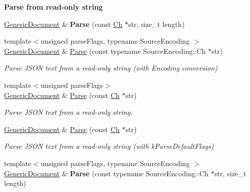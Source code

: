 \begin{Indent}{\bf Parse from read-\/only string}
\begin{DoxyCompactItemize}
\item 
\hyperlink{class_generic_document}{Generic\+Document} \& {\bfseries Parse} (const \hyperlink{class_generic_value_ade0e0ce64ccd5d852da57a35e720bafb}{Ch} $\ast$str, size\+\_\+t length)\hypertarget{class_generic_document_ab13d8358acc0648e3f91f6b825365e4f}{}\label{class_generic_document_ab13d8358acc0648e3f91f6b825365e4f}

\item 
{\footnotesize template$<$unsigned parse\+Flags, typename Source\+Encoding $>$ }\\\hyperlink{class_generic_document}{Generic\+Document} \& \hyperlink{class_generic_document_aadee36db7064cc9894a75c848831cdae}{Parse} (const typename Source\+Encoding\+::\+Ch $\ast$str)
\begin{DoxyCompactList}\small\item\em Parse J\+S\+ON text from a read-\/only string (with Encoding conversion) \end{DoxyCompactList}\item 
{\footnotesize template$<$unsigned parse\+Flags$>$ }\\\hyperlink{class_generic_document}{Generic\+Document} \& \hyperlink{class_generic_document_a5e377f840009b5cee6757be29525ce0b}{Parse} (const \hyperlink{class_generic_value_ade0e0ce64ccd5d852da57a35e720bafb}{Ch} $\ast$str)
\begin{DoxyCompactList}\small\item\em Parse J\+S\+ON text from a read-\/only string. \end{DoxyCompactList}\item 
\hyperlink{class_generic_document}{Generic\+Document} \& \hyperlink{class_generic_document_a49ae6de6fd0bc820d9864a106c10b4da}{Parse} (const \hyperlink{class_generic_value_ade0e0ce64ccd5d852da57a35e720bafb}{Ch} $\ast$str)
\begin{DoxyCompactList}\small\item\em Parse J\+S\+ON text from a read-\/only string (with k\+Parse\+Default\+Flags) \end{DoxyCompactList}\item 
{\footnotesize template$<$unsigned parse\+Flags, typename Source\+Encoding $>$ }\\\hyperlink{class_generic_document}{Generic\+Document} \& {\bfseries Parse} (const typename Source\+Encoding\+::\+Ch $\ast$str, size\+\_\+t length)\hypertarget{class_generic_document_a46b5028cc760c4e915a0d5216af9f7e2}{}\label{class_generic_document_a46b5028cc760c4e915a0d5216af9f7e2}


\end{DoxyCompactItemize}
\end{Indent}
